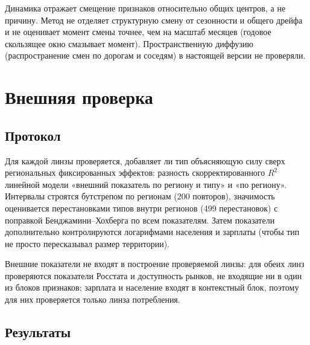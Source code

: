 \documentclass[11pt,a4paper]{article}
\begin{document}
Динамика отражает смещение признаков относительно общих центров, а не причину. Метод не отделяет структурную смену от сезонности и общего дрейфа и не оценивает момент смены точнее, чем на масштаб месяцев (годовое скользящее окно смазывает момент). Пространственную диффузию (распространение смен по дорогам и соседям) в настоящей версии не проверяли.

\section{Внешняя проверка}\label{ux432ux43dux435ux448ux43dux44fux44f-ux43fux440ux43eux432ux435ux440ux43aux430}

\subsection{Протокол}\label{ux43fux440ux43eux442ux43eux43aux43eux43b-1}

Для каждой линзы проверяется, добавляет ли тип объясняющую силу сверх региональных фиксированных эффектов: разность скорректированного \(R^2\) линейной модели «внешний показатель по региону и типу» и «по региону». Интервалы строятся бутстрепом по регионам (200 повторов), значимость оценивается перестановками типов внутри регионов (499 перестановок) с поправкой Бенджамини--Хохберга по всем показателям. Затем показатели дополнительно контролируются логарифмами населения и зарплаты (чтобы тип не просто пересказывал размер территории).

Внешние показатели не входят в построение проверяемой линзы: для обеих линз проверяются показатели Росстата и доступность рынков, не входящие ни в один из блоков признаков; зарплата и население входят в контекстный блок, поэтому для них проверяется только линза потребления.

\subsection{Результаты}\label{ux440ux435ux437ux443ux43bux44cux442ux430ux442ux44b-1}

\begingroup\footnotesize\setlength{\tabcolsep}{4pt}
\end{document}
